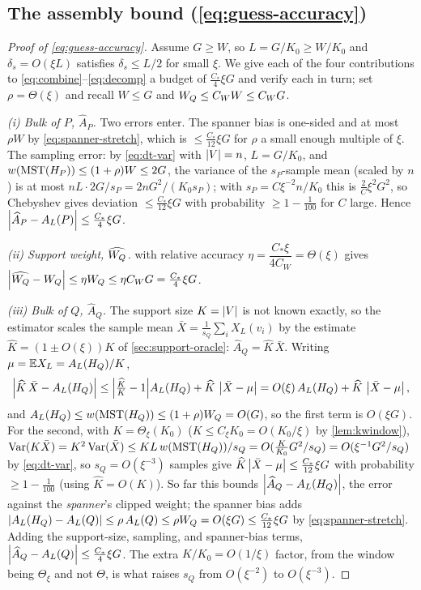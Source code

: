\subsection{The assembly bound (\texorpdfstring{\eqref{eq:guess-accuracy}}{guess accuracy})}\label{sec:app-combine}

\begin{proof}[Proof of \eqref{eq:guess-accuracy}]
Assume $G\ge W$, so $L=G/K_0\ge W/K_0$ and $\delta_s=O(\xi L)$ satisfies $\delta_s\le L/2$ for small
$\xi$. We give each of the four contributions to \eqref{eq:combine}--\eqref{eq:decomp} a budget of
$\tfrac{C_*}{4}\xi G$ and verify each in turn; set $\rho=\Theta(\xi)$ and recall $W\le G$ and $W_Q\le C_W
W\le C_W G$.

\emph{(i) Bulk of $P$, $\widehat A_P$.} Two errors enter. The spanner bias is one-sided and at most $\rho
W$ by \eqref{eq:spanner-stretch}, which is $\le\tfrac{C_*}{12}\xi G$ for $\rho$ a small enough multiple of
$\xi$. The sampling error: by \eqref{eq:dt-var} with $\left|V\right|=n$, $L=G/K_0$, and $w(\mathrm{MST}(H_P))\le(1+\rho)W
\le 2G$, the variance of the $s_P$-sample mean (scaled by $n$) is at most $nL\cdot 2G/s_P=2nG^2/(K_0 s_P)$;
with $s_P=C\xi^{-2}n/K_0$ this is $\tfrac{2}{C}\xi^2G^2$, so Chebyshev gives deviation $\le\tfrac{C_*}{12}
\xi G$ with probability $\ge 1-\tfrac1{100}$ for $C$ large. Hence $\left|\widehat A_P-A_L(P)\right|\le\tfrac{C_*}
4\xi G$.

\emph{(ii) Support weight, $\widehat{W_Q}$.}  with relative accuracy
$\eta=\dfrac{C_*\xi}{4C_W}=\Theta(\xi)$ gives $\left|\widehat{W_Q}-W_Q\right|\le\eta W_Q\le\eta C_W G=\tfrac{C_*}4\xi
G$.

\emph{(iii) Bulk of $Q$, $\widehat A_Q$.} The support size $K=\left|V\right|$ is not known exactly, so the estimator
scales the sample mean $\bar X=\tfrac1{s_Q}\sum_i X_L(v_i)$ by the estimate $\widehat K=(1\pm O(\xi))K$ of
\cref{sec:support-oracle}: $\widehat A_Q=\widehat K\,\bar X$. Writing $\mu=\mathbb{E} X_L=A_L(H_Q)/K$,
\[
  \left|\widehat K\,\bar X-A_L(H_Q)\right|\le\Bigl|\tfrac{\widehat K}{K}-1\Bigr|A_L(H_Q)+\widehat K\,\left|\bar X-\mu\right|
   =O(\xi)\,A_L(H_Q)+\widehat K\,\left|\bar X-\mu\right|,
\]
and $A_L(H_Q)\le w(\mathrm{MST}(H_Q))\le(1+\rho)W_Q=O(G)$, so the first term is $O(\xi G)$. For the second, with
$K=\Theta_\xi(K_0)$ ($K\le C_\xi K_0=O(K_0/\xi)$ by \cref{lem:kwindow}), $\operatorname{Var}(K\bar X)=K^2\operatorname{Var}(\bar X)\le
K L\,w(\mathrm{MST}(H_Q))/s_Q=O(\tfrac{K}{K_0}G^2/s_Q)=O(\xi^{-1}G^2/s_Q)$ by \eqref{eq:dt-var}, so $s_Q=
O(\xi^{-3})$ samples give $\widehat K\left|\bar X-\mu\right|\le\tfrac{C_*}{12}\xi G$ with probability
$\ge1-\tfrac1{100}$ (using $\widehat K=O(K)$). So far this bounds $\left|\widehat A_Q-A_L(H_Q)\right|$, the error
against the \emph{spanner}'s clipped weight; the spanner bias adds $\left|A_L(H_Q)-A_L(Q)\right|\le\rho\,A_L(Q)\le
\rho W_Q=O(\xi G)\le\tfrac{C_*}{12}\xi G$ by \eqref{eq:spanner-stretch}. Adding the support-size, sampling,
and spanner-bias terms, $\left|\widehat A_Q-A_L(Q)\right|\le\tfrac{C_*}4\xi G$. The extra $K/K_0=O(1/\xi)$ factor,
from the window being $\Theta_\xi$ and not $\Theta$, is what raises $s_Q$ from $O(\xi^{-2})$ to
$O(\xi^{-3})$.


\end{proof}
